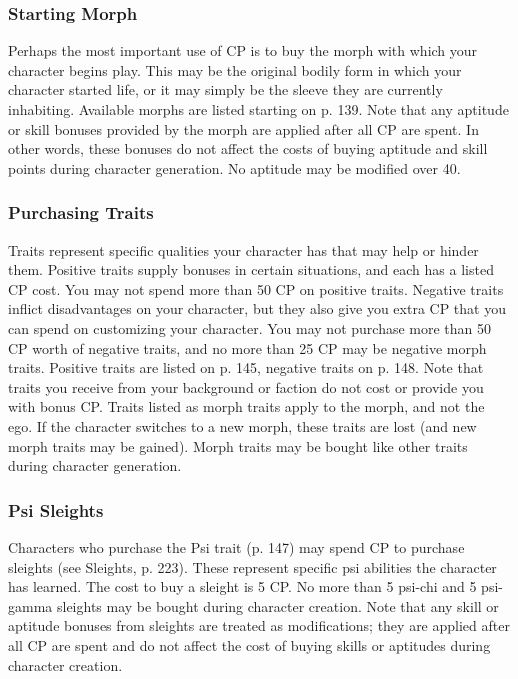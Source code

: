 \subsubsection{Starting Morph} \label{sec:starting-morph} 

Perhaps the most important use of CP is to buy the morph with which your character begins play. This may be the original bodily form in which your character started life, or it may simply be the sleeve they are currently inhabiting. Available morphs are listed starting on p. 139. Note that any aptitude or skill bonuses provided by the morph are applied after all CP are spent. In other words, these bonuses do not affect the costs of buying aptitude and skill points during character generation. No aptitude may be modified over 40. 

\subsubsection{Purchasing Traits} \label{sec:purchasing-traits} 

Traits represent specific qualities your character has that may help or hinder them. Positive traits supply bonuses in certain situations, and each has a listed CP cost. You may not spend more than 50 CP on positive traits. Negative traits inflict disadvantages on your character, but they also give you extra CP that you can spend on customizing your character. You may not purchase more than 50 CP worth of negative traits, and no more than 25 CP may be negative morph traits. Positive traits are listed on p. 145, negative traits on p. 148. Note that traits you receive from your background or faction do not cost or provide you with bonus CP. Traits listed as morph traits apply to the morph, and not the ego. If the character switches to a new morph, these traits are lost (and new morph traits may be gained). Morph traits may be bought like other traits during character generation. 

\subsubsection{Psi Sleights} \label{sec:purchasing-psi-sleights} 

Characters who purchase the Psi trait (p. 147) may spend CP to purchase sleights (see Sleights, p. 223). These represent specific psi abilities the character has learned. The cost to buy a sleight is 5 CP. No more than 5 psi-chi and 5 psi-gamma sleights may be bought during character creation. Note that any skill or aptitude bonuses from sleights are treated as modifications; they are applied after all CP are spent and do not affect the cost of buying skills or aptitudes during character creation. 

